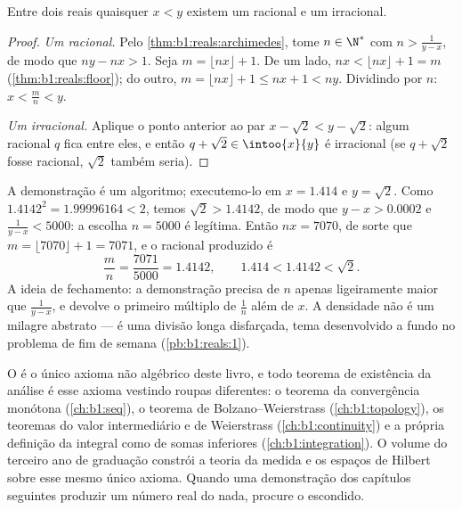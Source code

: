 \begin{theorem}\label{thm:b1:reals:density}
Entre dois reais quaisquer $x < y$ existem um racional e um
irracional.
\end{theorem}

\begin{proof}
\emph{Um racional.} Pelo \cref{thm:b1:reals:archimedes}, tome $n \in
\N^*$
com $n > \frac{1}{y - x}$, de modo que $ny - nx > 1$. Seja $m = \lfloor
nx \rfloor + 1$. De um lado, $nx < \lfloor nx \rfloor + 1 = m$
(\cref{thm:b1:reals:floor}); do outro, $m = \lfloor nx \rfloor +
1 \leq nx + 1 < ny$. Dividindo por $n$: $x < \frac mn < y$.

\emph{Um irracional.} Aplique o ponto anterior ao par $x -
\sqrt 2 < y - \sqrt 2$: algum racional $q$ fica entre eles, e então
$q + \sqrt 2 \in \intoo{x}{y}$ é irracional (se $q + \sqrt 2$ fosse
racional, $\sqrt 2$ também seria).
\end{proof}

\begin{example}\label{ex:b1:reals:densityrun}
A demonstração é um algoritmo; executemo-lo em $x = 1.414$ e
$y = \sqrt 2$. Como $1.4142^2 = 1.99996164 < 2$, temos $\sqrt 2
> 1.4142$, de modo que $y - x > 0.0002$ e $\frac{1}{y - x} < 5000$: a
escolha $n = 5000$ é legítima. Então $nx = 7070$, de sorte que $m = \lfloor
7070 \rfloor + 1 = 7071$, e o racional produzido é
\[
\frac{m}{n} = \frac{7071}{5000} = 1.4142,
\qquad
1.414 < 1.4142 < \sqrt 2 .
\]
A ideia de fechamento: a demonstração precisa de $n$ apenas ligeiramente
maior que $\frac{1}{y-x}$, e devolve o primeiro múltiplo de $\frac 1n$
além de $x$. A densidade não é um milagre abstrato --- é uma divisão
longa disfarçada, tema desenvolvido a fundo no problema de fim de
semana (\cref{pb:b1:reals:1}).
\end{example}

\begin{remark}
O  é o único axioma não algébrico deste
livro, e todo teorema de existência da análise é esse axioma
vestindo roupas diferentes: o teorema da convergência monótona
(\cref{ch:b1:seq}), o teorema de Bolzano--Weierstrass
(\cref{ch:b1:topology}), os teoremas do valor intermediário e de Weierstrass
(\cref{ch:b1:continuity}) e a própria definição da
integral como  de somas inferiores (\cref{ch:b1:integration}).
O volume do terceiro ano de graduação constrói a teoria da medida e os
espaços de Hilbert sobre esse mesmo único axioma. Quando uma demonstração
dos capítulos seguintes produzir um número real do nada, procure o
 escondido.
\end{remark}

